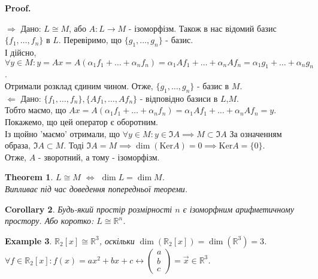 \documentclass[a4paper, 10pt]{article}
\makeatletter
\def\qed{$\blacksquare$}
\def\ker#1{\textrm{Ker} {#1}}
\def\rightproof{$\boxed{\Rightarrow}$ }
\def\leftproof{$\boxed{\Leftarrow}$ }
\theoremstyle{theoremdd}
\newtheorem{theorem}{Theorem}[subsection]
\theoremstyle{theoremdd}
\theoremstyle{theoremdd}
\theoremstyle{theoremdd}
\newtheorem{example}[theorem]{Example}
\theoremstyle{theoremdd}
\theoremstyle{theoremdd}
\theoremstyle{theoremdd}
\theoremstyle{theoremdd}
\newtheorem{corollary}[theorem]{Corollary}
\renewenvironment{proof}[1][Proof.\\]{\par
\pushQED{\hfill \qed}%
\normalfont \topsep6\p@\@plus6\p@\relax
\trivlist
\item\relax
{\bfseries
#1\@addpunct{.}}\hspace\labelsep\ignorespaces
}{%
\popQED\endtrivlist\@endpefalse
}
\makeatother
\begin{document}
	\begin{proof}
	\rightproof Дано: $L \cong M$, або $A: L \to M$ - ізоморфізм. Також в нас відомий базис $\{f_1,\dots,f_n\}$ в $L$. Перевіримо, що $\{g_1,\dots,g_n\}$ - базис.\\
	І дійсно, $\forall y \in M: y = Ax = A(\alpha_1 f_1 + \dots + \alpha_n f_n) = \alpha_1 Af_1 + \dots + \alpha_n Af_n = \alpha_1 g_1 + \dots + \alpha_n g_n$.\\
	Отримали розклад єдиним чином. Отже, $\{g_1,\dots,g_n\}$ - базис в $M$.
	\bigskip \\
	\leftproof Дано: $\{f_1,\dots,f_n\}, \{Af_1,\dots,Af_n\}$ - відповідно базиси в $L$,$M$.\\
	Тобто маємо, що $Ax = A(\alpha_1 f_1 + \dots + \alpha_n f_n) = \alpha_1 Af_1 + \dots + \alpha_n Af_n = y$.\\
	Покажемо, що цей оператор є оборотним.\\
Із щойно 'маємо' отримали, що $\forall y \in M: y \in \Im A \implies M \subset \Im A$ За означенням образа, $\Im A \subset M$. Тоді $\Im A = M \implies \dim(\ker A) = 0 \implies \ker A = \{0\}$.\\
	Отже, $A$ - зворотний, а тому - ізоморфізм.
	\end{proof}
	
	\begin{theorem}
	$L \cong M$ $\iff$ $\dim L = \dim M$.\\
	\textit{Випливає під час доведення попередньої теореми.}
	\end{theorem}
	
	\begin{corollary}
	Будь-який простір розмірності $n$ є ізоморфним арифметичному простору. Або коротко: $L \cong \mathbb{R}^n$.
	\end{corollary}
	
	\begin{example}
	$\mathbb{R}_2[x] \cong \mathbb{R}^3$, оскільки $\dim(\mathbb{R}_2[x]) = \dim (\mathbb{R}^3) = 3$.\\
	$\forall f \in \mathbb{R}_2[x]: f(x) = ax^2 + bx +c \leftrightarrow \begin{pmatrix}
	a \\ b \\ c
	\end{pmatrix} = \vec{x} \in \mathbb{R}^3$.
	\end{example}
	
\end{document}
